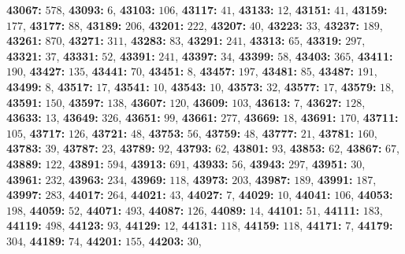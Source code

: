 \textsf{\bfseries 43067:} $578$, \textsf{\bfseries 43093:} $6$, \textsf{\bfseries 43103:} $106$, \textsf{\bfseries 43117:} $41$, \textsf{\bfseries 43133:} $12$, \textsf{\bfseries 43151:} $41$, \textsf{\bfseries 43159:} $177$, \textsf{\bfseries 43177:} $88$, \textsf{\bfseries 43189:} $206$, \textsf{\bfseries 43201:} $222$, \textsf{\bfseries 43207:} $40$, \textsf{\bfseries 43223:} $33$, \textsf{\bfseries 43237:} $189$, \textsf{\bfseries 43261:} $870$, \textsf{\bfseries 43271:} $311$, \textsf{\bfseries 43283:} $83$, \textsf{\bfseries 43291:} $241$, \textsf{\bfseries 43313:} $65$, \textsf{\bfseries 43319:} $297$, \textsf{\bfseries 43321:} $37$, \textsf{\bfseries 43331:} $52$, \textsf{\bfseries 43391:} $241$, \textsf{\bfseries 43397:} $34$, \textsf{\bfseries 43399:} $58$, \textsf{\bfseries 43403:} $365$, \textsf{\bfseries 43411:} $190$, \textsf{\bfseries 43427:} $135$, \textsf{\bfseries 43441:} $70$, \textsf{\bfseries 43451:} $8$, \textsf{\bfseries 43457:} $197$, \textsf{\bfseries 43481:} $85$, \textsf{\bfseries 43487:} $191$, \textsf{\bfseries 43499:} $8$, \textsf{\bfseries 43517:} $17$, \textsf{\bfseries 43541:} $10$, \textsf{\bfseries 43543:} $10$, \textsf{\bfseries 43573:} $32$, \textsf{\bfseries 43577:} $17$, \textsf{\bfseries 43579:} $18$, \textsf{\bfseries 43591:} $150$, \textsf{\bfseries 43597:} $138$, \textsf{\bfseries 43607:} $120$, \textsf{\bfseries 43609:} $103$, \textsf{\bfseries 43613:} $7$, \textsf{\bfseries 43627:} $128$, \textsf{\bfseries 43633:} $13$, \textsf{\bfseries 43649:} $326$, \textsf{\bfseries 43651:} $99$, \textsf{\bfseries 43661:} $277$, \textsf{\bfseries 43669:} $18$, \textsf{\bfseries 43691:} $170$, \textsf{\bfseries 43711:} $105$, \textsf{\bfseries 43717:} $126$, \textsf{\bfseries 43721:} $48$, \textsf{\bfseries 43753:} $56$, \textsf{\bfseries 43759:} $48$, \textsf{\bfseries 43777:} $21$, \textsf{\bfseries 43781:} $160$, \textsf{\bfseries 43783:} $39$, \textsf{\bfseries 43787:} $23$, \textsf{\bfseries 43789:} $92$, \textsf{\bfseries 43793:} $62$, \textsf{\bfseries 43801:} $93$, \textsf{\bfseries 43853:} $62$, \textsf{\bfseries 43867:} $67$, \textsf{\bfseries 43889:} $122$, \textsf{\bfseries 43891:} $594$, \textsf{\bfseries 43913:} $691$, \textsf{\bfseries 43933:} $56$, \textsf{\bfseries 43943:} $297$, \textsf{\bfseries 43951:} $30$, \textsf{\bfseries 43961:} $232$, \textsf{\bfseries 43963:} $234$, \textsf{\bfseries 43969:} $118$, \textsf{\bfseries 43973:} $203$, \textsf{\bfseries 43987:} $189$, \textsf{\bfseries 43991:} $187$, \textsf{\bfseries 43997:} $283$, \textsf{\bfseries 44017:} $264$, \textsf{\bfseries 44021:} $43$, \textsf{\bfseries 44027:} $7$, \textsf{\bfseries 44029:} $10$, \textsf{\bfseries 44041:} $106$, \textsf{\bfseries 44053:} $198$, \textsf{\bfseries 44059:} $52$, \textsf{\bfseries 44071:} $493$, \textsf{\bfseries 44087:} $126$, \textsf{\bfseries 44089:} $14$, \textsf{\bfseries 44101:} $51$, \textsf{\bfseries 44111:} $183$, \textsf{\bfseries 44119:} $498$, \textsf{\bfseries 44123:} $93$, \textsf{\bfseries 44129:} $12$, \textsf{\bfseries 44131:} $118$, \textsf{\bfseries 44159:} $118$, \textsf{\bfseries 44171:} $7$, \textsf{\bfseries 44179:} $304$, \textsf{\bfseries 44189:} $74$, \textsf{\bfseries 44201:} $155$, \textsf{\bfseries 44203:} $30$, 
